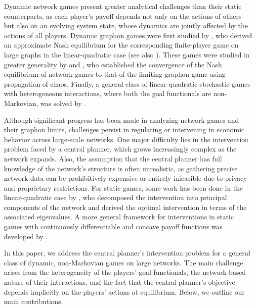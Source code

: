 \documentclass[11pt]{article}
\numberwithin{equation}{section}
\begin{document}
Dynamic network games present greater analytical challenges than their static counterparts, as each player's payoff depends not only on the actions of others but also on an evolving system state, whose dynamics are jointly affected by the actions of all players. Dynamic graphon games were first studied by \citet{gao2020linear}, who derived an approximate Nash equilibrium for the corresponding finite-player game on large graphs in the linear-quadratic case (see also \citet{aurell2022stochastic}). These games were studied in greater generality by \citet{bayraktar2023propagation} and \citet{tangpi2024optimal}, who established the convergence of the Nash equilibrium of network games to that of the limiting graphon game using propagation of chaos. Finally, a general class of linear-quadratic stochastic games with heterogeneous interactions, where both the goal functionals are non-Markovian, was solved by \citet{neuman2024stochastic}. 

Although significant progress has been made in analyzing network games and their graphon limits, challenges persist in regulating or intervening in economic behavior across large-scale networks. One major difficulty lies in the intervention problem faced by a central planner, which grows increasingly complex as the network expands. Also, the assumption that the central planner has full knowledge of the network’s structure is often unrealistic, as gathering precise network data can be prohibitively expensive or entirely infeasible due to privacy and proprietary restrictions. For static games, some work has been done in the linear-quadratic case by \citet{galeotti2020targeting}, who decomposed the intervention into principal components of the network and derived the optimal intervention in terms of the associated eigenvalues. A more general framework for interventions in static games with continuously differentiable and concave payoff functions was developed by \citet{parise2023graphon}. 

In this paper, we address the central planner’s intervention problem for a general class of dynamic, non-Markovian games on large networks. The main challenge arises from the heterogeneity of the players’ goal functionals, the network-based nature of their interactions, and the fact that the central planner’s objective depends implicitly on the players’ actions at equilibrium. Below, we outline our main contributions.
\end{document}
